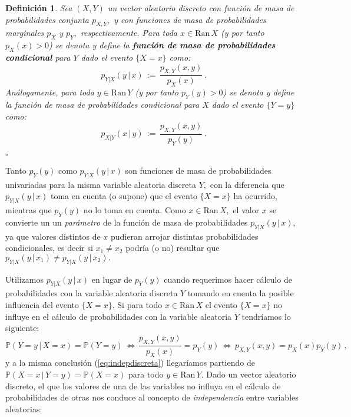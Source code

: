 \documentclass[spanish,10pt,letterpaper]{article}
\newtheorem{defi}{Definición}
\newcommand{\prob}{\mathbb{P}}
\newcommand{\qed}{\begin{flushright}$\square$\end{flushright}}
\begin{document}
\bigskip 

\begin{defi}\label{def:fmpcondicional}
    Sea $(X,Y)$ un vector aleatorio discreto con función de masa de probabilidades conjunta $p_{X,Y},$ y con funciones de masa de probabilidades marginales $p_X$ y $p_Y,$ respectivamente. Para toda $x\in\text{Ran}\,X$ (y por tanto $p_X(x)>0$) se denota y define la \textbf{función de masa de probabilidades condicional} para $Y$ dado el evento $\{X=x\}$ como:
    \begin{equation*}
        p_{Y|X}(y\,|\,x) \,:=\, \frac{p_{X,Y}(x,y)}{p_X(x)}\,.
    \end{equation*}
    Análogamente, para toda $y\in\text{Ran}\,Y$ (y por tanto $p_Y(y)>0$) se denota y define la función de masa de probabilidades condicional para $X$ dado el evento $\{Y=y\}$ como:
    \begin{equation*}
        p_{X|Y}(x\,|\,y) \,:=\, \frac{p_{X,Y}(x,y)}{p_Y(y)}\,.
    \end{equation*} \qed 
\end{defi}

Tanto $p_Y(y)$ como $p_{Y|X}(y\,|\,x)$ son funciones de masa de probabilidades univariadas para la misma variable aleatoria discreta $Y,$ con la diferencia que $p_{Y|X}(y\,|\,x)$ toma en cuenta (o supone) que el evento $\{X=x\}$ ha ocurrido, mientras que $p_Y(y)$ no lo toma en cuenta. Como $x\in\text{Ran}\,X,$ el valor $x$ se convierte un un \textit{parámetro} de la función de masa de probabilidades $p_{Y|X}(y\,|\,x),$ ya que valores distintos de $x$ pudieran arrojar distintas probabilidades condicionales, es decir si $x_1\neq x_2$ podría (o no) resultar que $p_{Y|X}(y\,|\,x_1)\neq p_{Y|X}(y\,|\,x_2).$

\medskip 

Utilizamos $p_{Y|X}(y\,|\,x)$ en lugar de $p_Y(y)$ cuando requerimos hacer cálculo de probabilidades con la variable aleatoria discreta $Y$ tomando en cuenta la posible influencia del evento $\{X=x\}.$ Si para todo $x\in\text{Ran}\,X$ el evento $\{X=x\}$ no influye en el cálculo de probabilidades con la variable aleatoria $Y$ tendríamos lo siguiente:
\begin{equation}\label{eq:indepdiscreta}
    \prob(Y=y\,|\,X=x) = \prob(Y=y) \,\Leftrightarrow\, \frac{p_{X,Y}(x,y)}{p_X(x)} = p_Y(y) \,\Leftrightarrow\, p_{X,Y}(x,y) = p_X(x)p_Y(y)\,,
\end{equation}
y a la misma conclusión (\ref{eq:indepdiscreta}) llegaríamos partiendo de $\prob(X=x\,|\,Y=y)=\prob(X=x)$ para todo $y\in\text{Ran}\,Y.$ Dado un vector aleatorio discreto, el que los valores de una de las variables no influya en el cálculo de probabilidades de otras nos conduce al concepto de \textit{independencia} entre variables aleatorias: 
\end{document}
